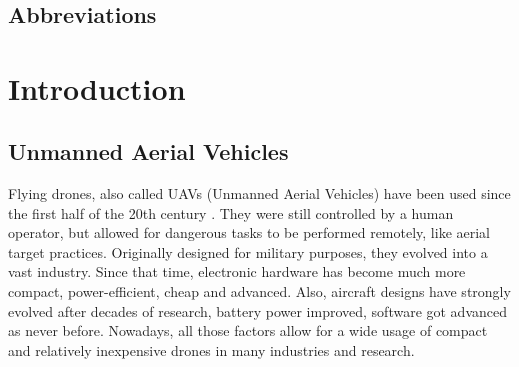 


\conditionalClearPage



\conditionalClearPage




\conditionalClearPage

\begin{changemargin}{0.8cm}{0.8cm}

~\vfill{}

\section*{Abbreviations}



\vskip 2.5cm

\end{changemargin}

\conditionalClearPage


\tableofcontents

\conditionalClearPage

\pagestyle{full}


\chapter{Introduction}


\section{Unmanned Aerial Vehicles}
Flying drones, also called UAVs (Unmanned Aerial Vehicles) have been used since the first half of the 20th century \cite{keane2013brief}. They were still controlled by a human operator, but allowed for dangerous tasks to be performed remotely, like aerial target practices. Originally designed for military purposes, they evolved into a vast industry. Since that time, electronic hardware has become much more compact, power-efficient, cheap and advanced. Also, aircraft designs have strongly evolved after decades of research, battery power improved, software got advanced as never before. Nowadays, all those factors allow for a wide usage of compact and relatively inexpensive drones in many industries and research. 


